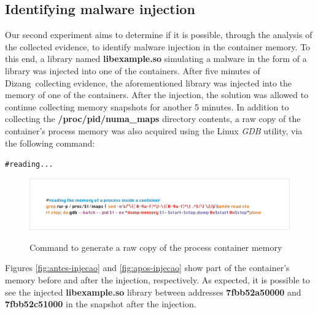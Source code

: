 \documentclass[conference]{IEEEtran}
\newcommand{\marcos}[1]{{\color{green}{MARCOS: #1}}}
\newcommand{\fancyname}{Dizang}
\begin{document}
\subsection{Identifying malware injection}

Our second experiment aims to determine if it is possible, through the analysis of the collected evidence, to identify malware injection in the container memory.
%
To this end, a library named \textbf{libexample.so} simulating a malware in the form of a library was injected into one of the containers.
%
After five minutes of \fancyname\ collecting evidence, the aforementioned library was injected into the memory of one of the containers. 
%
After the injection, the solution was allowed to continue collecting memory snapshots for another 5 minutes.
%
In addition to collecting the \textbf{/proc/pid/numa\_maps} directory contents, a raw copy of the container's process memory was also acquired using the Linux \textit{GDB} utility, via the following command:

\noindent\texttt{\footnotesize \#reading...\marcos{escreva aqui o comando... usar uma figura pra texto não faz lá muito sentido...}}

\begin{figure}[htb!]
\footnotesize
\caption{Command to generate a raw copy of the process container memory}
\includegraphics[scale=0.40]{comando-copia-memoria-gdb.jpg}
\centering
\label{fig:comando-copia}
\end{figure}


%
Figures \ref{fig:antes-injecao} and \ref{fig:apos-injecao} show part of the container's memory before and after the injection, respectively.
%
As expected, it is possible to see the injected \textbf{libexample.so} library between addresses \textbf{7fbb52a50000} and \textbf{7fbb52c51000} in the snapshot after the injection.
%
%
\end{document}
